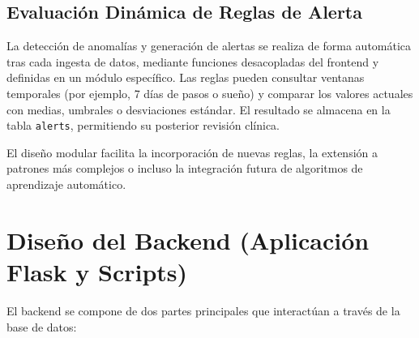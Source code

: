 \subsection{Evaluación Dinámica de Reglas de Alerta}
La detección de anomalías y generación de alertas se realiza de forma automática tras cada ingesta de datos, mediante funciones desacopladas del frontend y definidas en un módulo específico. Las reglas pueden consultar ventanas temporales (por ejemplo, 7 días de pasos o sueño) y comparar los valores actuales con medias, umbrales o desviaciones estándar. El resultado se almacena en la tabla \texttt{alerts}, permitiendo su posterior revisión clínica.

El diseño modular facilita la incorporación de nuevas reglas, la extensión a patrones más complejos o incluso la integración futura de algoritmos de aprendizaje automático.


\section{Diseño del Backend (Aplicación Flask y Scripts)}
\label{sec:diseno_backend}

El backend se compone de dos partes principales que interactúan a través de la base de datos:

